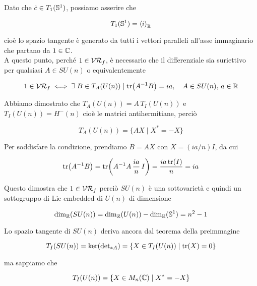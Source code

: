 Dato che $ \dot{c} \in T_{1}(\S^{1}) $, possiamo asserire che

\begin{equation}
	T_{1}(\S^{1}) = \ev{i}_{\R}
\end{equation}

cioè lo spazio tangente è generato da tutti i vettori paralleli all'asse immaginario che partano da $ 1 \in \C $.\\
A questo punto, perché $ 1 \in \VR_{f} $, è necessario che il differenziale sia suriettivo per qualsiasi $ A \in SU(n) $ o equivalentemente

\begin{equation}
	1 \in \VR_{f} \iff \E B \in T_{A}(U(n)) \mid \tr(A^{-1} B) = i a %
	\qcomma A \in SU(n), \, a \in \R
\end{equation}

Abbiamo dimostrato che $ T_{A}(U(n)) = A \, T_{I}(U(n)) $ e $ T_{I}(U(n)) = H^{-}(n) $ cioè le matrici antihermitiane, perciò

\begin{equation}
	T_{A}(U(n)) = \{ AX \mid X^{*} = -X \}
\end{equation}

Per soddisfare la condizione, prendiamo $ B = AX $ con $ X = (i a/n) I $, da cui

\begin{equation}
	\tr(A^{-1} B) = \tr(A^{-1} A \, \dfrac{ia}{n} \, I) = \dfrac{ia \tr(I)}{n} = i a
\end{equation}

Questo dimostra che $ 1 \in \VR_{f} $ perciò $ SU(n) $ è una sottovarietà e quindi un sottogruppo di Lie embedded di $ U(n) $ di dimensione

\begin{equation}
	\dim_{\R}(SU(n)) = \dim_{\R}(U(n)) - \dim_{\R}(\S^{1}) = n^{2} - 1
\end{equation}

Lo spazio tangente di $ SU(n) $ deriva ancora dal teorema della preimmagine

\begin{equation}
	T_{I}(SU(n)) = \ker({\det}_{*A}) = \{ X \in T_{I}(U(n)) \mid \tr(X) = 0 \}
\end{equation}

ma sappiamo che

\begin{equation}
	T_{I}(U(n)) = \{ X \in M_{n}(\C) \mid X^{*} = - X \}
\end{equation}

